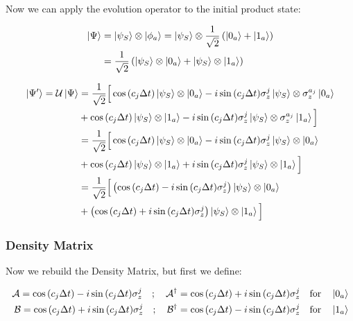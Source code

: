 \documentclass[a4paper,12pt]{article}
\begin{document}
	  \newpage
	  
	  Now we can apply the evolution operator to the initial product state: 
	  
	  \begin{align}
	  	\ket{\Psi}
	  	&= \ket{\psi_S} \otimes \ket{\phi_a}
	  	= \ket{\psi_S} \otimes \frac{1}{\sqrt{2}} \left( \ket{0_a} + \ket{1_a} \right) \notag \\
	  	&= \frac{1}{\sqrt{2}} \left(\ket{\psi_S} \otimes  \ket{0_a} + \ket{\psi_S} \otimes  \ket{1_a} \right)
	  \end{align}
	  
	  \begin{align}
	  	\ket{\Psi'} = \mathcal{U} \ket{\Psi}
	  	&= \frac{1}{\sqrt{2}} \Big[ \cos{\left(c_j \Delta t\right)} \ket{\psi_{S}} \otimes \ket{0_a} - i\sin{\left(c_j \Delta t \right)} \sigma_{z}^{j} \ket{\psi_{S}} \otimes \sigma_{z}^{a_j}\ket{0_a} \notag \\
	  	& + \cos{\left(c_j \Delta t\right)} \ket{\psi_{S}} \otimes \ket{1_a} - i\sin{\left(c_j \Delta t \right)} \sigma_{z}^{j} \ket{\psi_{S}} \otimes \sigma_{z}^{a_j}\ket{1_a} \Big] \notag \\
	  	&= \frac{1}{\sqrt{2}} \Big[ \cos{\left(c_j \Delta t\right)} \ket{\psi_{S}} \otimes \ket{0_a} - i\sin{\left(c_j \Delta t \right)} \sigma_{z}^{j} \ket{\psi_{S}} \otimes \ket{0_a} \notag \\
	  	& + \cos{\left(c_j \Delta t\right)} \ket{\psi_{S}} \otimes \ket{1_a} + i\sin{\left(c_j \Delta t \right)} \sigma_{z}^{j} \ket{\psi_{S}} \otimes \ket{1_a} \Big] \notag \\
	  	&= \frac{1}{\sqrt{2}} \Big[ \left( \cos{\left(c_j \Delta t\right)} - i\sin{\left(c_j \Delta t \right)} \sigma_{z}^{j}\right) \ket{\psi_{S}} \otimes \ket{0_a}  \notag \\
	  	& + \left( \cos{\left(c_j \Delta t\right)} + i\sin{\left(c_j \Delta t \right)}  \sigma_{z}^{j}\right) \ket{\psi_{S}} \otimes \ket{1_a}  \Big] 
	  \end{align}
	  
	  \subsubsection{Density Matrix}
	  
	  Now we rebuild the Density Matrix, but first we define:
	  
	  \begin{equation*}
	  	\begin{aligned}
	  		\mathcal{A} = \cos{\left( c_j \Delta t \right)} - i \sin{\left( c_j \Delta t \right)} \sigma_{z}^{j} \quad ; \quad \mathcal{A^{\dagger}} = \cos{\left( c_j \Delta t \right)} + i \sin{\left( c_j \Delta t \right)} \sigma_{z}^{j} \quad \text{for} \quad \ket{0_a}\\
	  		\mathcal{B} = \cos{\left( c_j \Delta t \right)} + i \sin{\left( c_j \Delta t \right)} \sigma_{z}^{j} \quad ; \quad \mathcal{B^{\dagger}} = \cos{\left( c_j \Delta t \right)} - i \sin{\left( c_j \Delta t \right)} \sigma_{z}^{j}  \quad \text{for} \quad \ket{1_a} 
	  	\end{aligned}
	  \end{equation*}
	  
\end{document}
